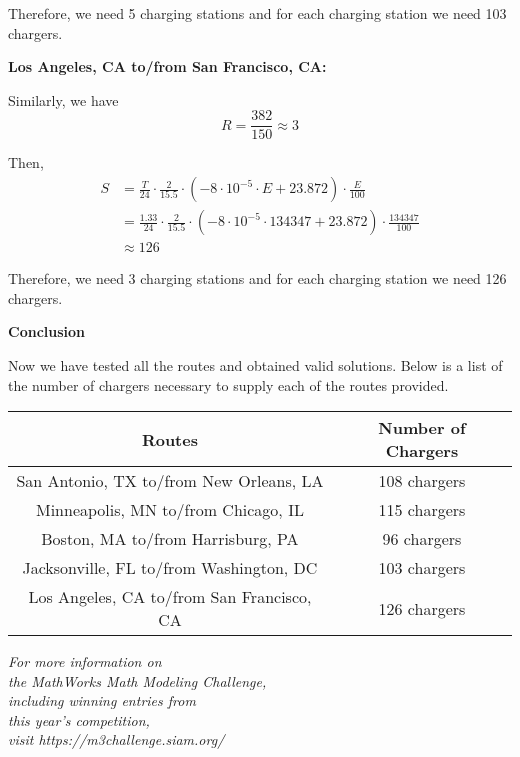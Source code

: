 Therefore, we need 5 charging stations and for each charging station we need 103 chargers.

\noindent
\textbf{Los Angeles, CA to/from San Francisco, CA:}

Similarly, we have
\[R = \frac{382}{150} \approx 3\]

Then,
\begin{align*}
	S &= \frac{T}{24}\cdot \frac{2}{15.5}\cdot(-8\cdot10^{-5}\cdot E+23.872)\cdot \frac{E}{100}\\
	&= \frac{1.33}{24}\cdot \frac{2}{15.5}\cdot(-8\cdot10^{-5}\cdot 134347+23.872)\cdot \frac{134347}{100}\\
	&\approx 126
\end{align*}

Therefore, we need 3 charging stations and for each charging station we need 126 chargers.

\noindent
\textbf{Conclusion}

Now we have tested all the routes and obtained valid solutions. Below is a list of the number of chargers necessary to supply each of the routes provided. 

\begin{center}
	\begin{tabular}{|c|c|}
		\hline \textbf{Routes} & \textbf{Number of Chargers}\\
		\hline San Antonio, TX to/from New Orleans, LA & 108 chargers\\
		\hline Minneapolis, MN to/from Chicago, IL & 115 chargers\\
		\hline Boston, MA to/from Harrisburg, PA & 96 chargers\\
		\hline Jacksonville, FL to/from Washington, DC & 103 chargers\\
		\hline Los Angeles, CA to/from San Francisco, CA & 126 chargers\\
		\hline
	\end{tabular}
\end{center}

\vspace{1.25cm}

\begin{center}
\textit{For more information on\\
the MathWorks Math Modeling Challenge,\\
including winning entries from\\
this year's competition,\\
visit https://m3challenge.siam.org/}
\end{center}
